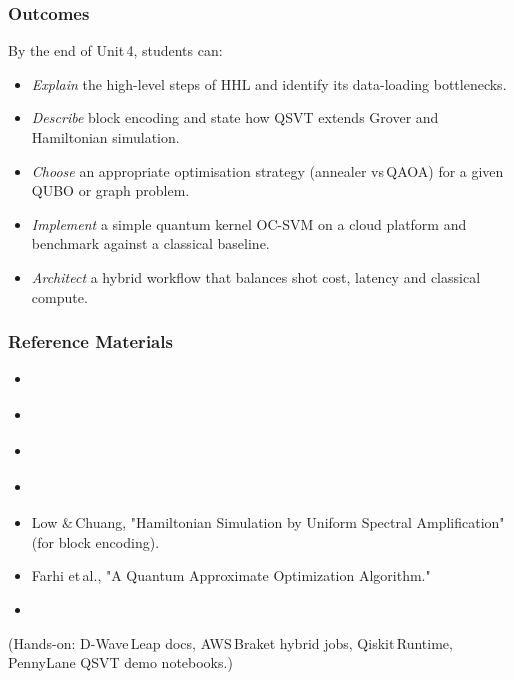 \subsubsection{Outcomes}

By the end of Unit 4, students can:
\begin{itemize}
	\item \emph{Explain} the high-level steps of HHL and identify its data-loading bottlenecks.
	
	\item \emph{Describe} block encoding and state how QSVT extends Grover and Hamiltonian simulation.
	
	\item \emph{Choose} an appropriate optimisation strategy (annealer vs QAOA) for a given QUBO or graph problem.
	
	\item \emph{Implement} a simple quantum kernel OC-SVM on a cloud platform and benchmark against a classical baseline.
	
	\item \emph{Architect} a hybrid workflow that balances shot cost, latency and classical compute.
\end{itemize}

\subsubsection{Reference Materials}
\begin{itemize}
	\item \citeauthor{Lipton:2021} 
	\item \citeauthor{Harrow:2009} 
	\item \citeauthor{Abhijith:2022} 
	\item \citeauthor{Dalzell:2023} 
	\item Low \& Chuang, "Hamiltonian Simulation by Uniform Spectral Amplification" (for block encoding).
	\item Farhi et al., "A Quantum Approximate Optimization Algorithm."
	\item \citeauthor{Havlicek:2019} 
\end{itemize}

(Hands-on: D-Wave Leap docs, AWS Braket hybrid jobs, Qiskit Runtime, PennyLane QSVT demo notebooks.)

